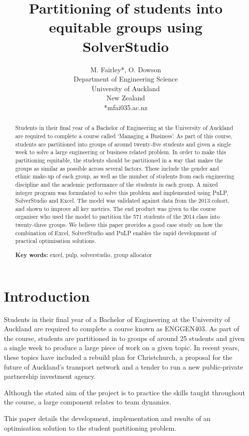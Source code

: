 \documentclass[12pt]{ORSNZ}
\title{Partitioning of students into equitable groups using SolverStudio}
\author{M. Fairley*, O. Dowson\\Department of Engineering Science\\University of
  Auckland\\New Zealand\\{*}mfai035\@@aucklanduni.ac.nz}
\date{} %
\begin{document}
\maketitle
\pagestyle{empty} \thispagestyle{empty}
\begin{abstract}
Students in their final year of a Bachelor of Engineering at the University of Auckland are required to complete a course called `Managing a Business'. As part of this course, students are partitioned into groups of around twenty-five students and given a single week to solve a large engineering or business related problem. In order to make this partitioning equitable, the students should be partitioned in a way that makes the groups as similar as possible across several factors. These include the gender and ethnic make-up of each group, as well as the number of students from each engineering discipline and the academic performance of the students in each group. A mixed integer program was formulated to solve this problem and implemented using PuLP, SolverStudio and Excel. The model was validated against data from the 2013 cohort, and shown to improve all key metrics. The end product was given to the course organiser who used the model to partition the 571 students of the 2014 class into twenty-three groups. We believe this paper provides a good case study on how the combination of Excel, SolverStudio and PuLP enables the rapid development of practical optimisation solutions.

\textbf{Key words:} excel, pulp, solverstudio, group allocator
\end{abstract}

\section{Introduction}
Students in their final year of a Bachelor of Engineering at the University of Auckland are required to complete a course known as ENGGEN403. As part of the course, students are partitioned in to groups of around 25 students and given a single week to produce a large piece of work on a given topic. In recent years, these topics have included a rebuild plan for Christchurch, a proposal for the future of Auckland’s transport network and a tender to run a new public-private partnership investment agency.

Although the stated aim of the project is to practice the skills taught throughout the course, a large component relates to team dynamics. 

This paper details the development, implementation and results of an optimisation solution to the student partitioning problem. 
\end{document}

